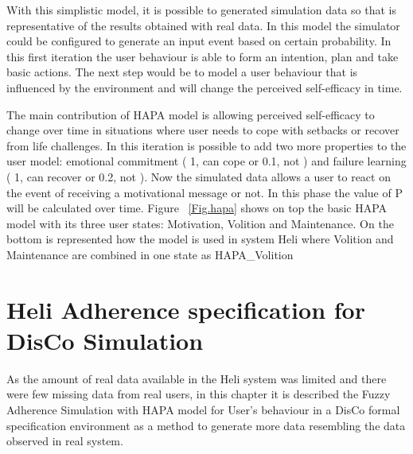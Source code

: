 \documentclass{llncs}
\begin{document}
With this simplistic model, it is possible to generated simulation data so that is representative of the results obtained with real data. In this model the simulator could be configured to generate an input event based on certain probability. In this first iteration the user behaviour is able to form an intention, plan and take basic actions. The next step would be to model a user behaviour that is influenced by the environment and will change the perceived self-efficacy in time.

The main contribution of HAPA model is allowing perceived self-efficacy to change over time in situations where user needs to cope with setbacks or recover from life challenges. In this iteration is possible to add two more properties to the user model: emotional commitment ( 1, can cope or 0.1, not ) and failure learning ( 1, can recover or 0.2, not ). Now the simulated data allows a user to react on the event of receiving a motivational message or not. In this phase the value of P will be calculated over time.
Figure ~\ref{Fig.hapa} shows on top the basic HAPA model with its three user states: Motivation, Volition and Maintenance. On the bottom is represented how the model is used in system Heli where Volition and Maintenance are combined in one state as HAPA\_Volition

\section {Heli Adherence specification for DisCo Simulation}
\label{sec.helimodel}

As the amount of real data available in the Heli system was limited and there were few missing data from real users, in this chapter it is described the Fuzzy Adherence Simulation with HAPA model for User's behaviour in a DisCo formal specification environment as a method to generate more data resembling the data observed in real system.
\end{document}
